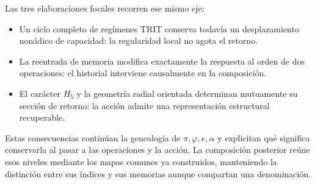 Las tres elaboraciones focales recorren ese mismo eje:
\begin{itemize}
 \item Un ciclo completo de regímenes TRIT conserva todavía un
 desplazamiento nonádico de capacidad: la regularidad local no agota
 el retorno.
 \item La reentrada de memoria modifica exactamente la respuesta al orden
 de dos operaciones: el historial interviene causalmente en la composición.
 \item El carácter $H_5$ y la geometría radial orientada determinan
 mutuamente su sección de retorno: la acción admite una representación
 estructural recuperable.
\end{itemize}
Estas consecuencias continúan la genealogía de $\pi,\varphi,e,\alpha$ y
explicitan qué significa conservarla al pasar a las operaciones y la
acción. La composición posterior reúne esos niveles mediante los mapas
comunes ya construidos, manteniendo la distinción entre sus índices y
sus memorias aunque compartan una denominación.
